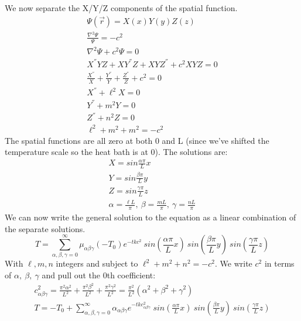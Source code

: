 \documentclass[a4paper,10pt]{article}
\numberwithin{equation}{section}
\begin{document}
We now separate the X/Y/Z components of the spatial function.
\begin{gather}
\Psi (\vec{r})=X(x)Y(y)Z(z)\\
\frac{\nabla ^2\Psi}{\Psi}=-c^2\\
\nabla ^2\Psi +c^2 \Psi =0\\
X^{''} YZ+XY^{''} Z+XYZ^{''} +c^2XYZ=0\\
\frac{X^{''} }{X}+\frac{Y^{''} }{Y}+\frac{Z^{''} }{Z}+c^2=0\\
X^{''} +\ell^2 X=0\\
Y^{''} +m^2 Y=0\\
Z^{''} +n^2 Z=0\\
\ell ^2+m^2+m^2=-c^2
\end{gather}
The spatial functions are all zero at both 0 and L (since we've shifted the temperature scale so the heat bath is at 0).
The solutions are:
\begin{gather}
X=sin\frac{\alpha \pi}{L}x\\
Y=sin\frac{\beta \pi}{L}y\\
Z=sin\frac{\gamma \pi}{L}z\\
\alpha=\frac{\ell L}{\pi},\ \beta=\frac{mL}{\pi},\ \gamma=\frac{nL}{\pi}
\end{gather}
We can now write the general solution to the equation as a linear combination of the separate solutions.
\begin{equation}
T=\sum _{\alpha,\beta,\gamma=0}^{\infty}\mu_{\alpha \beta \gamma}(-T_0)e^{-tkc^2}\ sin(\frac{\alpha\pi}{L}x)\ sin(\frac{\beta \pi}{L}y)\ sin(\frac{\gamma \pi}{L}z)
\end{equation}
With $\ell, m, n$ integers and subject to $\ell^2+m^2+n^2=-c^2$. We write $c^2$ in terms of $\alpha,\ \beta,\ \gamma$ and pull out the 0th coefficient:
\begin{gather}
c_{\alpha \beta \gamma}^2=\frac{\pi ^2 \alpha ^2}{L^2}+\frac{\pi ^2 \beta ^2}{L^2}+\frac{\pi ^2 \gamma ^2}{L^2}=\frac{\pi ^2}{L ^2}(\alpha ^2+\beta ^2+\gamma ^2)\\
T=-T_0+\sum _{\alpha,\beta,\gamma=0}^{\infty}\alpha_{\alpha \beta \gamma}e^{-tkc_{\alpha \beta \gamma}^2}\ sin(\frac{\alpha\pi}{L}x)\ sin(\frac{\beta \pi}{L}y)\ sin(\frac{\gamma \pi}{L}z)
\end{gather}
\end{document}
